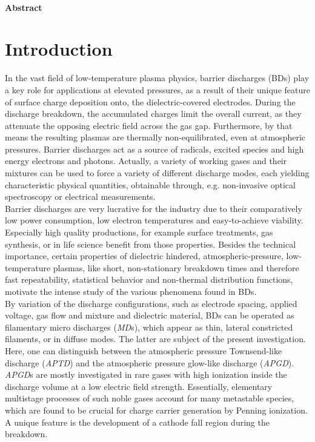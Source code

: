 \documentclass[a4paper,10pt,twoside]{article}
\newcommand{\tilt}[1]{\textit{#1}}
\begin{document}
	\begin{multicols}{2}
		\tableofcontents
	\end{multicols}
	
		\vspace{0.75cm}
	
		\paragraph{Abstract}
		
	\twocolumn

	\section{Introduction}\label{sec:intro}

		In the vast field of low-temperature plasma physics, barrier discharges (BDs) play a key role for applications at elevated pressures, as a result of their unique feature of surface charge deposition onto, the dielectric-covered electrodes. During the discharge breakdown, the accumulated charges limit the overall current, as they attenuate the opposing electric field across the gas gap. Furthermore, by that means the resulting plasmas are thermally non-equilibrated, even at atmospheric pressures. Barrier discharges act as a source of radicals, excited species and high energy electrons and photons. Actually, a variety of working gases and their mixtures can be used to force a variety of different discharge modes, each yielding characteristic physical quantities, obtainable through, e.g. non-invasive optical spectroscopy or electrical measurements.\\ 
		Barrier discharges are very lucrative for the industry due to their comparatively low power consumption, low electron temperatures and easy-to-achieve viability. Especially high quality productions, for example surface treatments, gas synthesis, or in life science benefit from those properties. Besides the technical importance, certain properties of dielectric hindered, atmospheric-pressure, low-temperature plasmas, like short, non-stationary breakdown times and therefore fast repeatability, statistical behavior and non-thermal distribution functions, motivate the intense study of the various phenomena found in BDs.\\
		By variation of the discharge configurations, such as electrode spacing, applied voltage, gas flow and mixture and dielectric material, BDs can be operated as filamentary micro discharges (\tilt{MD}s), which appear as thin, lateral constricted filaments, or in diffuse modes. The latter are subject of the present investigation. Here, one can distinguish between the atmospheric pressure Townsend-like discharge (\tilt{APTD}) and the atmospheric pressure glow-like discharge (\tilt{APGD}).\\
		\tilt{APGD}s are mostly investigated in rare gases with high ionization inside the discharge volume at a low electric field strength. Essentially, elementary multistage processes of such noble gases account for many metastable species, which are found to be crucial for charge carrier generation by Penning ionization. A unique feature is the development of a cathode fall region during the breakdown.
\end{document}

